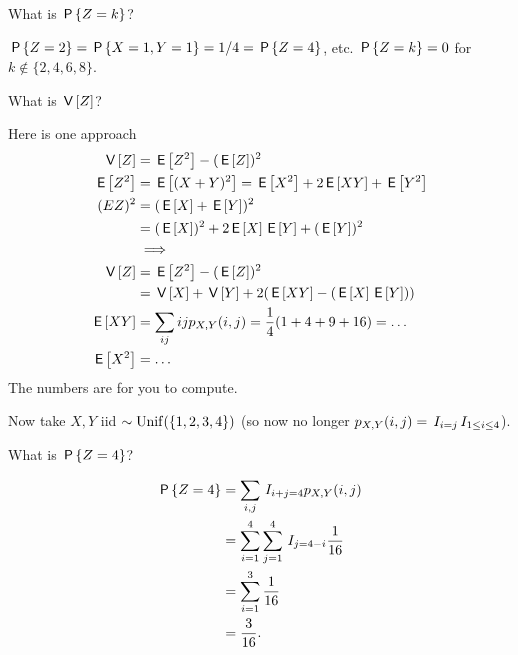 \documentclass[lectures]{subfiles}
\begin{document}
\begin{exercise}
What is $\P{Z=k}$?
\begin{solution}
$\P{Z=2} = \P{X=1, Y=1} = 1/4 = \P{Z=4}$, etc.
$\P{Z=k} = 0$ for $k\not \in \{2, 4, 6, 8\}$.
\end{solution}
\end{exercise}


\begin{exercise}
What is $\V Z$?
\begin{solution}
Here is one approach
\begin{align}
\label{eq:83}
\V Z &= \E{Z^2} - (\E Z)^{2}\\
\E{Z^2} &= \E{(X+Y)^{2}} = \E{X^{2}} + 2\E{XY} + \E{Y^{2}} \\
(E{Z})^{2} &= (\E X + \E Y)^{2} \\
 &= (\E X)^2 + 2\E X \E Y + (\E Y)^{2} \\
&\implies \\
\V Z &= \E{Z^2} - (\E Z)^{2}\\
 &= \V X + \V Y + 2 (\E{XY} - (\E X \E Y))\\
\E{XY} &= \sum_{ij} ijp_{X,Y}(i,j) = \frac 1 4 (1 + 4 + 9 + 16) = \ldots \\
\E{X^{2}} &= \ldots
\end{align}
The numbers are for you to compute.
\end{solution}
\end{exercise}

Now take $X, Y$ iid $\sim\Unif{\{1,2,3,4\}}$ (so now no longer $p_{X,Y}(i,j) = \1{i=j}\1{1\leq i \leq 4}$).

\begin{exercise}
What is $\P{Z=4}$?
\begin{solution}
\begin{align}
\label{eq:82}
\P{Z=4}
&= \sum_{i, j} \1{i+j=4} p_{X,Y}(i,j) \\
&= \sum_{i=1}^4 \sum_{j=1}^{4} \1{j=4-i} \frac{1}{16} \\
&= \sum_{i=1}^3  \frac{1}{16} \\
&= \frac{3}{16}.
\end{align}
\end{solution}
\end{exercise}
\end{document}
